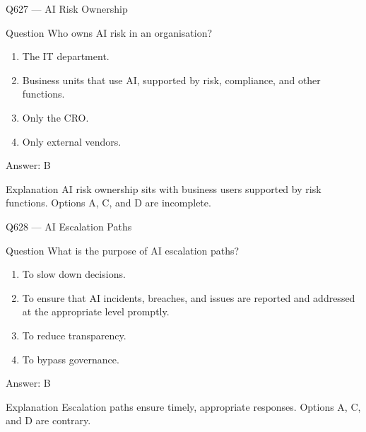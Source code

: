 \documentclass[aspectratio=169,8pt]{beamer}
\begin{document}
	\begin{frame}{Q627 --- AI Risk Ownership}
		\begin{block}{Question}
			Who owns AI risk in an organisation?
			\begin{enumerate}
				\item The IT department.
				\item Business units that use AI, supported by risk, compliance, and other functions.
				\item Only the CRO.
				\item Only external vendors.
			\end{enumerate}
		\end{block}
		\begin{exampleblock}{Answer: B}\end{exampleblock}
		\begin{block}{Explanation}
			AI risk ownership sits with business users supported by risk functions. Options A, C, and D are incomplete.
		\end{block}
	\end{frame}
	
	\begin{frame}{Q628 --- AI Escalation Paths}
		\begin{block}{Question}
			What is the purpose of AI escalation paths?
			\begin{enumerate}
				\item To slow down decisions.
				\item To ensure that AI incidents, breaches, and issues are reported and addressed at the appropriate level promptly.
				\item To reduce transparency.
				\item To bypass governance.
			\end{enumerate}
		\end{block}
		\begin{exampleblock}{Answer: B}\end{exampleblock}
		\begin{block}{Explanation}
			Escalation paths ensure timely, appropriate responses. Options A, C, and D are contrary.
		\end{block}
	\end{frame}
	
\end{document}
